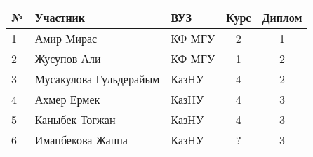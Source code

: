 \begin{center}
\begin{tabular}{|l|l|l|c|c|}
\hline
№ & Участник & ВУЗ & Курс & Диплом \\
\hline
1 & Амир Мирас & КФ МГУ & 2 & 1 \\
\hline
2 & Жусупов Али & КФ МГУ & 1 & 2 \\
\hline
3 & Мусакулова Гульдерайым & КазНУ & 4 & 2 \\
\hline
4 & Ахмер Ермек & КазНУ & 4 & 3 \\
\hline
5 & Каныбек Тогжан & КазНУ & 4 & 3 \\
\hline
6 & Иманбекова Жанна & КазНУ & ? & 3 \\
\hline
\end{tabular}
\end{center}
